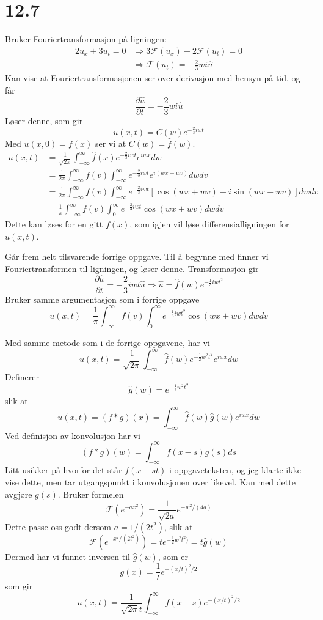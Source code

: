 \documentclass[11pt, a4paper, norsk]{NTNUoving}
\begin{document}
\section*{12.7}
\begin{oppgave}[1]
  Bruker Fouriertransformasjon på ligningen:
  \begin{align*}
    2u_x+3u_t = 0 &\Rightarrow 3\mathcal{F}(u_x)+2\mathcal{F}(u_t) = 0 \\
    &\Rightarrow \mathcal{F}(u_t) = -\frac{2}{3} w i \hat{u}
  \end{align*}
  Kan vise at Fouriertransformasjonen ser over derivasjon med hensyn på tid, og får
  \[
    \frac{\partial\hat{u}}{\partial t} = -\frac{2}{3} w i \hat{u}
  \]  
  Løser denne, som gir
  \[
    u(x,t) = C(w)e^{-\frac{2}{3}iwt}
  \]
  Med $u(x,0) = f(x)$ ser vi at $C(w) =\hat{f}(w)$.
  \begin{align*}
    u(x,t)&=\frac{1}{\sqrt{2\pi}}\int_{-\infty}^\infty\hat{f}(x)e^{-\frac{2}{3}iwt}e^{iwx}dw \\
          &=\frac{1}{2\pi}\int_{-\infty}^\infty f(v) \int_{-\infty}^{\infty}e^{-\frac{2}{3}iwt}e^{i(wx+wv)}dw dv \\
     &=\frac{1}{2\pi}\int_{-\infty}^\infty f(v) \int_{-\infty}^{\infty}e^{-\frac{2}{3}iwt}[\cos(wx+wv)+i\sin(wx+wv)]dw dv \\
     &=\frac{1}{\pi}\int_{-\infty}^\infty f(v) \int_{0}^{\infty}e^{-\frac{2}{3}iwt}\cos(wx+wv)dw dv 
  \end{align*}
  Dette kan løses for en gitt $f(x)$, som igjen vil løse differensialligningen for $u(x,t)$.
\end{oppgave}
\begin{oppgave}[2]
  Går frem helt tilsvarende forrige oppgave. Til å begynne med finner vi Fouriertransformen til ligningen, og løser denne. Transformasjon gir
  \[
    \frac{\partial\hat{u}}{\partial t} = -\frac{2}{3}iwt\hat{u}
    \Rightarrow \hat{u} = \hat{f}(w)e^{-\frac{1}{3}iwt^2}
  \]  
  Bruker samme argumentasjon som i forrige oppgave
  \[
    u(x,t) = \frac{1}{\pi}\int_{-\infty}^\infty f(v)\int_0^\infty e^{-\frac{1}{3}iwt^2}\cos(wx+wv)dw dv
  \]
\end{oppgave}
\begin{oppgave}[3]
  Med samme metode som i de forrige oppgavene, har vi
  \[
    u(x,t)=\frac{1}{\sqrt{2\pi}}\int_{-\infty}^\infty\hat{f}(w)e^{-\frac{1}{2}w^2t^2}e^{iwx}dw
  \]
  Definerer
  \[
    \hat{g}(w)=e^{-\frac{1}{2}w^2t^2}
  \]  
  slik at
  \[
    u(x,t)=(f*g)(x)=\int_{-\infty}^\infty \hat{f}(w)\hat{g}(w)e^{iwx}dw
  \]  
  Ved definisjon av konvolusjon har vi
  \[
    (f*g)(w)=\int_{-\infty}^\infty f(x-s)g(s) ds
  \]
  Litt usikker på hvorfor det står $f(x-st)$ i oppgaveteksten, og jeg klarte ikke vise dette, men tar utgangspunkt i konvolusjonen over likevel. Kan med dette avgjøre $g(s)$. Bruker formelen
  \[
    \mathcal{F}\left(e^{-ax^2}\right)=\frac{1}{\sqrt{2a}}e^{-w^2/(4a)}
  \]
  Dette passe oss godt dersom $a=1/(2t^2)$, slik at
  \[
    \mathcal{F}\left(e^{-x^2/(2t^2)}\right)=te^{-\frac{1}{2}w^2t^2)}=t\hat{g}(w)
  \]
  Dermed har vi funnet inversen til $\hat{g}(w)$, som er
  \[
    g(x) = \frac{1}{t}e^{-(x/t)^2/2} 
  \]
  som gir
  \[
    u(x,t)=\frac{1}{\sqrt{2\pi}t}\int_{-\infty}^\infty f(x-s)e^{-(x/t)^2/2}
  \]
\end{oppgave}  
\end{document}
